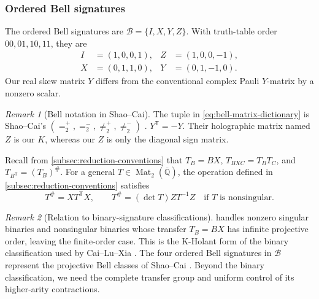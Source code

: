 \documentclass[11pt,letterpaper,onecolumn]{article}
\theoremstyle{plain}
\theoremstyle{definition}
\theoremstyle{remark}
\newtheorem{remark}[remark]{Remark}
\newcommand{\AlgNums}{\overline{\mathbb Q}}
\newcommand{\Mat}{\operatorname{Mat}}
\begin{document}
	\subsubsection{Ordered Bell signatures}
	\label{subsec:pauli-notation}
	
	The ordered Bell signatures are \(\mathcal B=\{I,X,Y,Z\}\).
    With truth-table order \(00,01,10,11\), they are
	\begin{equation}
		\begin{aligned}
			I&=(1,0,0,1),&
			Z&=(1,0,0,-1),\\
			X&=(0,1,1,0),&
			Y&=(0,1,-1,0).
		\end{aligned}
		\label{eq:bell-matrix-dictionary}
	\end{equation}
	Our real skew matrix \(Y\) differs from the conventional complex Pauli
	\(Y\)-matrix by a nonzero scalar.
	
	\begin{remark}[Bell notation in Shao--Cai]
		The tuple in \cref{eq:bell-matrix-dictionary} is Shao--Cai's
		\((=^+_2,=^-_2,\neq^+_2,\neq^-_2)\) \cite[Section~2]{ShaoCai2020}.
		\(Y^{\mathsf T}=-Y\).  Their holographic matrix named \(Z\) is our \(K\),
		whereas our \(Z\) is only the diagonal sign matrix.
	\end{remark}
	
	
Recall from \cref{subsec:reduction-conventions} that \(T_B=BX\),
\(T_{BXC}=T_BT_C\), and \(T_{B^{\mathsf T}}=(T_B)^\#\).
	For a general \(T\in\Mat_2(\AlgNums)\), the operation defined in
	\cref{subsec:reduction-conventions} satisfies
	\begin{equation}
		T^\#=XT^{\mathsf T}X,
		\qquad
		T^\#=(\det T)ZT^{-1}Z\quad\text{if }T\text{ is nonsingular}.
		\label{eq:transfer-reversal}
	\end{equation}
	
	\begin{remark}[Relation to binary-signature classifications]
         handles nonzero singular binaries and
        nonsingular binaries whose transfer \(T_B=BX\) has infinite projective
        order, leaving the finite-order case. This is the K-Holant form of the
        binary classification used by Cai--Lu--Xia
        \cite{CaiLuXia2009,CaiLuXia2018RealHolantc}. The four ordered Bell
		signatures in \(\mathcal B\) represent
		the projective Bell classes of Shao--Cai \cite{ShaoCai2020}.  Beyond
		the binary classification, we need the complete transfer group
		and uniform control of its higher-arity contractions.
	\end{remark}
	
\end{document}
